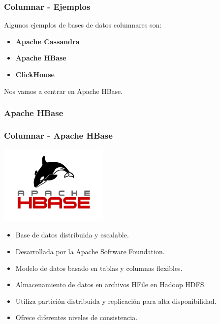 \begin{frame}
    \frametitle{Columnar - Ejemplos}
    Algunos ejemplos de bases de datos columnares son: 
    
    \begin{itemize}
        \item \textbf{Apache Cassandra}
        
        \item \textbf{Apache HBase}
        
        \item \textbf{ClickHouse}
    \end{itemize}

     
    
    Nos vamos a centrar en Apache HBase.
\end{frame}

\subsubsection{Apache HBase}

\begin{frame}
    \frametitle{Columnar - Apache HBase}
    \centering
    \includegraphics[width=0.4\textwidth]{images/hbase-logo.png}
    \begin{itemize}
        \item Base de datos distribuida y escalable.  
        \item Desarrollada por la Apache Software Foundation.  
        \item Modelo de datos basado en tablas y columnas flexibles.  
        \item Almacenamiento de datos en archivos HFile en Hadoop HDFS.  
        \item Utiliza partición distribuida y replicación para alta disponibilidad.  
        \item Ofrece diferentes niveles de consistencia.
    \end{itemize}

\end{frame}


